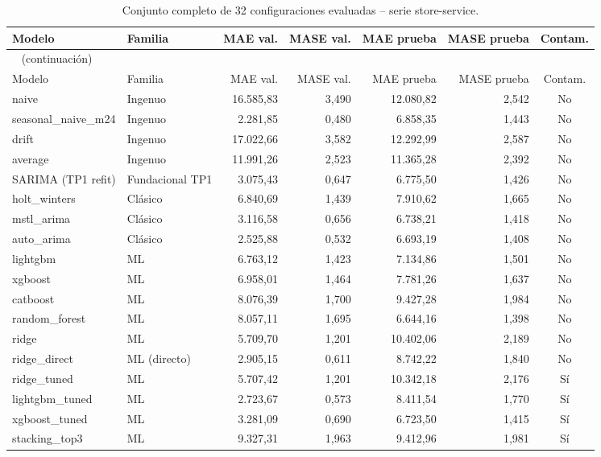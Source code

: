 \begingroup
\tiny
\begin{longtable}{llrrrrc}
  \caption{Conjunto completo de 32 configuraciones evaluadas -- serie store-service.}
  \label{tab:completo_store}\\
  \toprule
  Modelo & Familia & MAE val. & MASE val. & MAE prueba & MASE prueba & Contam. \\
  \midrule
  \endfirsthead
  \multicolumn{7}{l}{\small \tablename\ \thetable{} (continuación)}\\
  \toprule
  Modelo & Familia & MAE val. & MASE val. & MAE prueba & MASE prueba & Contam. \\
  \midrule
  \endhead
  \bottomrule
  \endfoot
    naive & Ingenuo & 16.585,83 & 3,490 & 12.080,82 & 2,542 & No \\
    seasonal\_naive\_m24 & Ingenuo & 2.281,85 & 0,480 & 6.858,35 & 1,443 & No \\
    drift & Ingenuo & 17.022,66 & 3,582 & 12.292,99 & 2,587 & No \\
    average & Ingenuo & 11.991,26 & 2,523 & 11.365,28 & 2,392 & No \\
    SARIMA (TP1 refit) & Fundacional TP1 & 3.075,43 & 0,647 & 6.775,50 & 1,426 & No \\
    holt\_winters & Clásico & 6.840,69 & 1,439 & 7.910,62 & 1,665 & No \\
    mstl\_arima & Clásico & 3.116,58 & 0,656 & 6.738,21 & 1,418 & No \\
    auto\_arima & Clásico & 2.525,88 & 0,532 & 6.693,19 & 1,408 & No \\
    lightgbm & ML & 6.763,12 & 1,423 & 7.134,86 & 1,501 & No \\
    xgboost & ML & 6.958,01 & 1,464 & 7.781,26 & 1,637 & No \\
    catboost & ML & 8.076,39 & 1,700 & 9.427,28 & 1,984 & No \\
    random\_forest & ML & 8.057,11 & 1,695 & 6.644,16 & 1,398 & No \\
    ridge & ML & 5.709,70 & 1,201 & 10.402,06 & 2,189 & No \\
    ridge\_direct & ML (directo) & 2.905,15 & 0,611 & 8.742,22 & 1,840 & No \\
    ridge\_tuned & ML & 5.707,42 & 1,201 & 10.342,18 & 2,176 & Sí \\
    lightgbm\_tuned & ML & 2.723,67 & 0,573 & 8.411,54 & 1,770 & Sí \\
    xgboost\_tuned & ML & 3.281,09 & 0,690 & 6.723,50 & 1,415 & Sí \\
    stacking\_top3 & ML & 9.327,31 & 1,963 & 9.412,96 & 1,981 & Sí \\

\end{longtable}
